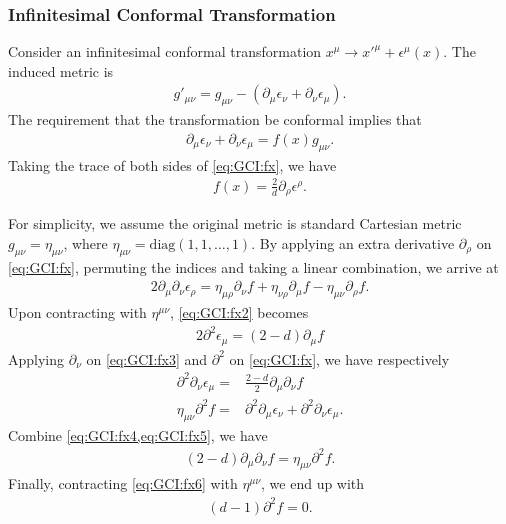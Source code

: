 \documentclass[10pt]{article}
\begin{document}
\subsubsection{Infinitesimal Conformal Transformation}
Consider an infinitesimal conformal transformation $x^\mu\to x'^{\mu}+\epsilon^\mu(x)$.
The induced metric is 
\begin{align}
    g'_{\mu\nu}=g_{\mu\nu}-\left(\partial_\mu\epsilon_\nu+\partial_\nu\epsilon_\mu\right).
\end{align}
The requirement that the transformation be conformal implies that 
\begin{align}
    \partial_\mu\epsilon_\nu+\partial_\nu\epsilon_\mu=f(x)g_{\mu\nu}.\label{eq:GCI:fx}
\end{align}
Taking the trace of both sides of \cref{eq:GCI:fx}, we have 
\begin{align}
    f(x)=\frac{2}{d}\partial_\rho\epsilon^\rho.\label{eq:GCI:fx1}
\end{align}

For simplicity, we assume the original metric is standard Cartesian metric $g_{\mu\nu}=\eta_{\mu\nu}$, where $\eta_{\mu\nu}=\mathrm{diag}(1,1,\dots,1)$.
By applying an extra derivative $\partial_\rho$ on \cref{eq:GCI:fx}, permuting the indices and taking a linear combination, we arrive at
\begin{align}
    2\partial_\mu\partial_\nu\epsilon_\rho=\eta_{\mu\rho}\partial_\nu f+\eta_{\nu\rho}\partial_\mu f-\eta_{\mu\nu}\partial_\rho f.\label{eq:GCI:fx2}
\end{align}
Upon contracting with $\eta^{\mu\nu}$, \cref{eq:GCI:fx2} becomes 
\begin{align}
    2\partial^2\epsilon_\mu=(2-d)\partial_\mu f \label{eq:GCI:fx3}
\end{align}
Applying $\partial_\nu$ on \cref{eq:GCI:fx3} and $\partial^2$ on \cref{eq:GCI:fx}, we have respectively
\begin{align}
    \partial^2\partial_\nu\epsilon_\mu=&\frac{2-d}{2}\partial_\mu\partial_\nu f\label{eq:GCI:fx4}\\
    \eta_{\mu\nu}\partial^2 f=&\partial^2\partial_\mu\epsilon_\nu+\partial^2\partial_\nu\epsilon_\mu.\label{eq:GCI:fx5}
\end{align} 
Combine \cref{eq:GCI:fx4,eq:GCI:fx5}, we have
\begin{align}
    (2-d)\partial_\mu\partial_\nu f=\eta_{\mu\nu}\partial^2 f.\label{eq:GCI:fx6}
\end{align}
Finally, contracting \cref{eq:GCI:fx6} with $\eta^{\mu\nu}$, we end up with 
\begin{align}
    (d-1)\partial^2 f=0.\label{eq:GCI:fx7}
\end{align}
\end{document}
